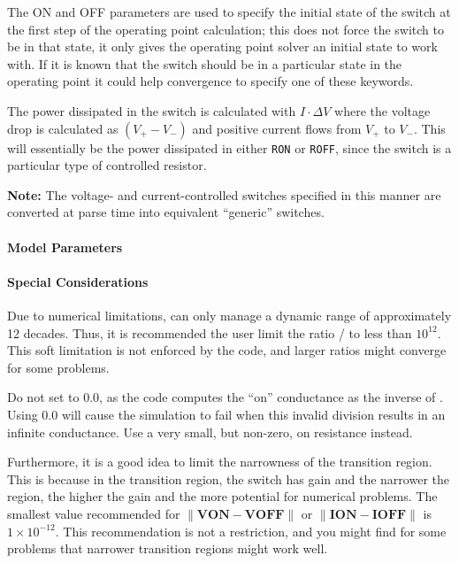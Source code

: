 \begin{Device}
The ON and OFF parameters are used to specify the initial state of the
switch at the first step of the operating point calculation; this does
not force the switch to be in that state, it only gives the operating
point solver an initial state to work with.  If it is known that the
switch should be in a particular state in the operating point it could
help convergence to specify one of these keywords.

The power dissipated in the switch is calculated with $I \cdot \Delta V$ 
where the voltage drop is calculated as $(V_+ - V_-)$ and positive current 
flows from $V_+$ to $V_-$.  This will essentially be the power dissipated
in either \texttt{RON} or \texttt{ROFF}, since the switch is a particular 
type of controlled resistor.

\textbf{Note:} The voltage- and current-controlled switches specified
in this manner are converted at parse time into equivalent ``generic''
switches.

\end{Device}

\pagebreak

\paragraph{Model Parameters}


\paragraph{Special Considerations}

\begin{XyceItemize}
\item Due to numerical limitations, \Xyce{} can only manage a dynamic range of
  approximately 12 decades.  Thus, it is recommended the user limit the ratio
  / to less than $10^{12}$.  This soft limitation is not enforced by the code, and larger ratios might converge for some problems.
\item Do not set  to 0.0, as the code computes the ``on'' conductance as the inverse of .  Using 0.0 will cause the simulation to fail when this invalid division results in an infinite conductance.  Use a very small, but non-zero, on resistance instead.
\item Furthermore, it is a good idea to limit the narrowness of the transition
  region. This is because in the transition region, the switch has gain and the
  narrower the region, the higher the gain and the more potential for numerical
  problems.  The smallest value recommended for $\|\mathbf{VON - VOFF}\|$ or
  $\|\mathbf{ION - IOFF}\|$ is $1\times10^{-12}$.  This recommendation is not a restriction, and you might find for some problems that narrower transition regions might work well.
\end{XyceItemize}

